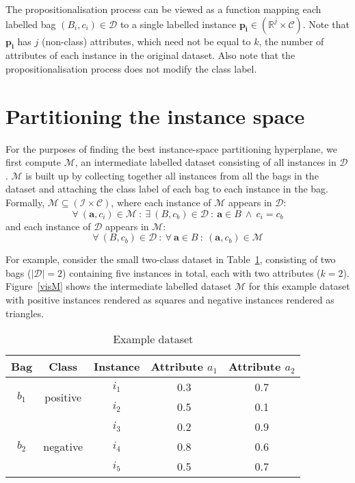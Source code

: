\documentclass[a4paper,12pt]{report} %
\newcommand{\real}{\mathbb{R}}
\newcommand{\mcl}[1]{\mathcal{#1}}
\newcommand{\vect}[1]{\boldsymbol{#1}}
\begin{document}
The propositionalisation process can be viewed as a function
    mapping each labelled bag $({B_i},c_i) \in \mcl{D}$ to 
    a single labelled instance $\vect{p_i} \in ( \real^j \times \mcl{C} )$.
Note that $\vect{p_i}$ has $j$ (non-class) attributes, 
    which need not be equal to $k$, the number of attributes of 
    each instance in the original dataset.
Also note that the propositionalisation process 
    does not modify the class label.
       

\section{Partitioning the instance space}

For the purposes of finding the best instance-space partitioning hyperplane,
    we first compute $\mcl{M}$, an intermediate labelled dataset 
    consisting of all instances in $\mcl{D}$.
$\mcl{M}$ is built up by collecting together all instances
    from all the bags in the dataset and 
    attaching the class label of each bag to 
    each instance in the bag.
Formally, $\mcl{M} \subseteq (\mcl{I} \times \mcl{C})$, 
    where each instance of $\mcl{M}$ appears in $\mcl{D}$:
    $$
        \forall~(\vect{a},c_i)\in\mcl{M} ~:~ 
            \exists~({B},c_b) \in \mcl{D} ~:~ 
                \vect{a} \in {B} ~\land~ c_i = c_b
    $$
    and each instance of $\mcl{D}$ appears in $\mcl{M}$:
    $$
        \forall~({B},c_b) \in \mcl{D} ~:~ 
            \forall~\vect{a} \in {B} ~:~
                (\vect{a},c_b) \in \mcl{M}
    $$    

For example, consider the small two-class dataset in Table~\ref{tEgData}, 
    consisting of two bags ($|\mcl{D}| = 2$)
    containing five instances in total, each with two attributes ($k=2$).
Figure~\ref{visM} shows the intermediate labelled dataset $\mcl{M}$ 
    for this example dataset with 
    positive instances rendered as squares and 
    negative instances rendered as triangles.

\begin{table}
\begin{center}
\begin{tabular}{ccccc}
    \toprule
    Bag & Class & Instance & Attribute $a_1$ & Attribute $a_2$ \\
    \midrule
    \multirow{2}{*}{$b_1$} & \multirow{2}{*}{positive} & $i_1$ & 0.3 & 0.7 \\
    &  & $i_2$ & 0.5 & 0.1 \\
    \cmidrule(r){1-5}
    \multirow{3}{*}{$b_2$} & \multirow{3}{*}{negative} & $i_3$ & 0.2 & 0.9 \\
    & & $i_4$ & 0.8 & 0.6 \\
    & & $i_5$ & 0.5 & 0.7 \\
    \bottomrule
    
\end{tabular}
\end{center}
\caption{Example dataset}
\label{tEgData}
\end{table}
\end{document}
